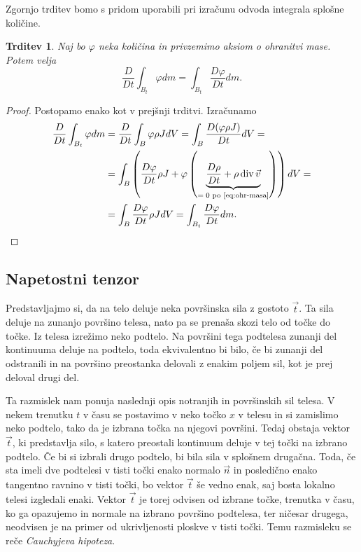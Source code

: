 \documentclass[12pt,a4paper,twoside]{article}
\theoremstyle{definition} %
\theoremstyle{plain} %
\newtheorem{trditev}[definicija]{Trditev}
\numberwithin{equation}{section}
\renewcommand{\div}{\operatorname{div}}
\renewcommand{\phi}{\varphi}
\newcommand{\DD}[2]{\ensuremath{\frac{D #1}{D #2}}}
\newcommand{\DDt}[1]{\DD{#1}{t}}
\newcommand{\vv}{\vec{v}}
\newcommand{\vt}{\vec{t}}
\newcommand{\vn}{\vec{n}}
\newcommand{\vx}{x}
\begin{document}
Zgornjo trditev bomo s pridom uporabili pri izračunu odvoda integrala splošne
količine.
\begin{trditev}
  \label{trd:swap-der-int}
  Naj bo $\phi$ neka količina in privzemimo aksiom o ohranitvi mase. Potem
  velja
  \begin{equation}
    \DDt{} \int_{B_t}\phi dm = \int_{B_t} \DDt{\phi} dm.
    \label{eq:swap-der-int}
  \end{equation}
\end{trditev}
\begin{proof}
Postopamo enako kot v prejšnji trditvi. Izračunamo
\begin{align*}
    \DDt{} \int_{B_t}\phi dm &=
    \DDt{} \int_{B}\phi \rho J dV =
    \int_{B} \DDt{(\phi \rho J)} dV  = \\ &=
  \int_{B} \left(\DDt{\phi} \rho J + \phi \left(\underbrace{\DDt{\rho} + \rho
  \div \vv}_{=\;0 \text{ po \eqref{eq:ohr-masa}}} \right) \right)dV  = \\ &=
  \int_{B} \DDt{\phi} \rho JdV =
  \int_{B_t} \DDt{\phi} dm. \qedhere
\end{align*}
\end{proof}

\subsection{Napetostni tenzor}
Predstavljajmo si, da na telo deluje neka površinska sila z gostoto $\vt$. Ta sila deluje
na zunanjo površino telesa, nato pa se prenaša skozi telo od točke do točke.
Iz telesa izrežimo neko podtelo. Na površini tega podtelesa zunanji del
kontinuuma deluje na podtelo, toda ekvivalentno bi bilo, če bi zunanji del odstranili in na površino
preostanka delovali z enakim poljem sil, kot je prej deloval drugi del.

Ta razmislek nam ponuja naslednji opis notranjih in površinskih sil telesa.  V nekem trenutku $t$ v
času se postavimo v neko točko $\vx$ v telesu in si zamislimo neko podtelo, tako da je izbrana točka
na njegovi površini. Tedaj obstaja vektor $\vt$, ki predstavlja silo, s katero preostali kontinuum
deluje v tej točki na izbrano podtelo. Če bi si izbrali drugo podtelo, bi bila sila v splošnem
drugačna. Toda, če sta imeli dve podtelesi v tisti točki enako normalo $\vn$ in posledično enako
tangentno ravnino v tisti točki, bo vektor $\vt$ še vedno enak, saj bosta lokalno telesi izgledali
enaki. Vektor $\vt$ je torej odvisen od izbrane točke, trenutka v času, ko ga opazujemo in normale
na izbrano površino podtelesa, ter ničesar drugega, neodvisen je na primer od ukrivljenosti ploskve
v tisti točki. Temu razmisleku se reče \emph{Cauchyjeva hipoteza}.
\end{document}
